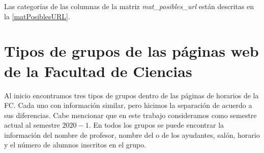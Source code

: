 Las categorías de las columnas de la matriz \textit{mat\_posibles\_url} están descritas en la \tablename{\ref{matPosiblesURL}}.

\dfNmatrizChica %


\section{Tipos de grupos de las páginas web de la Facultad de Ciencias} \label{TiposDeGpos}

Al inicio encontramos tres tipos de grupos dentro de las páginas de horarios de la FC. Cada uno con información similar, pero hicimos la separación de acuerdo a sus diferencias. Cabe mencionar que en este trabajo consideramos como semestre actual al semestre $2020-1$. En todos los grupos se puede encontrar la información del nombre de profesor, nombre del o de los ayudantes, salón, horario y el número de alumnos inscritos en el grupo.

